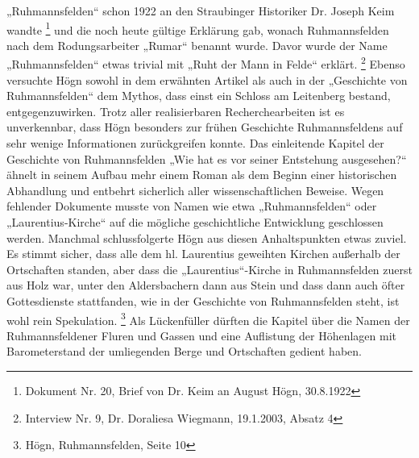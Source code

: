 \documentclass[a4paper]{article}
\begin{document}
„Ruhmannsfelden“ schon 1922 an den Straubinger Historiker Dr. Joseph
Keim wandte \footnote{Dokument Nr. 20, Brief von Dr. Keim an August
Högn, 30.8.1922} und die noch heute gültige Erklärung gab, wonach
Ruhmannsfelden nach dem Rodungsarbeiter „Rumar“ benannt wurde. Davor
wurde der Name „Ruhmannsfelden“ etwas trivial mit „Ruht der Mann in
Felde“ erklärt. \footnote{Interview Nr. 9, Dr. Doraliesa Wiegmann,
19.1.2003, Absatz 4} Ebenso versuchte Högn sowohl in dem erwähnten
Artikel als auch in der „Geschichte von Ruhmannsfelden“ dem Mythos,
dass einst ein Schloss am Leitenberg bestand, entgegenzuwirken. Trotz
aller realisierbaren Recherchearbeiten ist es unverkennbar, dass Högn
besonders zur frühen Geschichte Ruhmannsfeldens auf sehr wenige
Informationen zurückgreifen konnte. Das einleitende Kapitel der
Geschichte von Ruhmannsfelden „Wie hat es vor seiner Entstehung
ausgesehen?“ ähnelt in seinem Aufbau mehr einem Roman als dem Beginn
einer historischen Abhandlung und entbehrt sicherlich aller
wissenschaftlichen Beweise. Wegen fehlender Dokumente musste von Namen
wie etwa „Ruhmannsfelden“ oder „Laurentius-Kirche“ auf die mögliche
geschichtliche Entwicklung geschlossen werden. Manchmal schlussfolgerte
Högn aus diesen Anhaltspunkten etwas zuviel. Es stimmt sicher, dass
alle dem hl. Laurentius geweihten Kirchen außerhalb der Ortschaften
standen, aber dass die „Laurentius“-Kirche in Ruhmannsfelden zuerst aus
Holz war, unter den Aldersbachern dann aus Stein und dass dann auch
öfter Gottesdienste stattfanden, wie in der Geschichte von
Ruhmannsfelden steht, ist wohl rein Spekulation. \footnote{Högn,
Ruhmannsfelden, Seite 10} Als Lückenfüller dürften die Kapitel über die
Namen der Ruhmannsfeldener Fluren und Gassen und eine Auflistung der
Höhenlagen mit Barometerstand der umliegenden Berge und Ortschaften
gedient haben.
\end{document}
